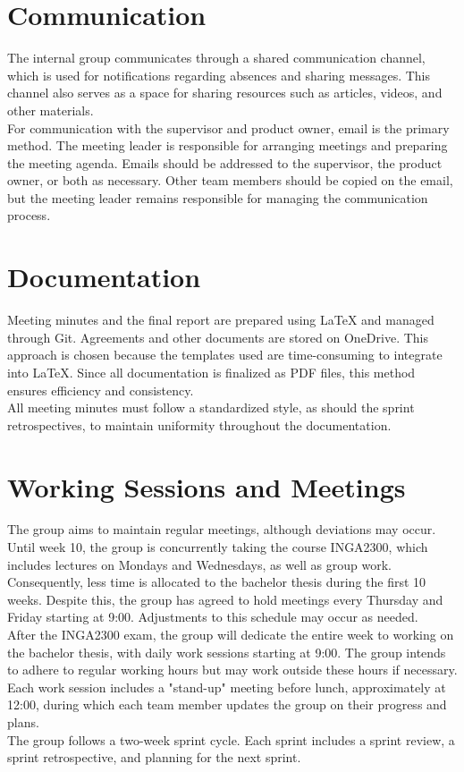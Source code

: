 \section{Communication}
The internal group communicates through a shared communication channel, which is used for notifications regarding absences and sharing messages. This channel also serves as a space for sharing resources such as articles, videos, and other materials.\\

For communication with the supervisor and product owner, email is the primary method. The meeting leader is responsible for arranging meetings and preparing the meeting agenda. Emails should be addressed to the supervisor, the product owner, or both as necessary. Other team members should be copied on the email, but the meeting leader remains responsible for managing the communication process.

\section{Documentation}
Meeting minutes and the final report are prepared using \LaTeX{} and managed through Git. Agreements and other documents are stored on OneDrive. This approach is chosen because the templates used are time-consuming to integrate into \LaTeX{}. Since all documentation is finalized as PDF files, this method ensures efficiency and consistency.\\

All meeting minutes must follow a standardized style, as should the sprint retrospectives, to maintain uniformity throughout the documentation.

\section{Working Sessions and Meetings}

The group aims to maintain regular meetings, although deviations may occur. Until week 10, the group is concurrently taking the course INGA2300, which includes lectures on Mondays and Wednesdays, as well as group work. Consequently, less time is allocated to the bachelor thesis during the first 10 weeks. Despite this, the group has agreed to hold meetings every Thursday and Friday starting at 9:00. Adjustments to this schedule may occur as needed.\\

After the INGA2300 exam, the group will dedicate the entire week to working on the bachelor thesis, with daily work sessions starting at 9:00. The group intends to adhere to regular working hours but may work outside these hours if necessary. Each work session includes a "stand-up" meeting before lunch, approximately at 12:00, during which each team member updates the group on their progress and plans.\\

The group follows a two-week sprint cycle. Each sprint includes a sprint review, a sprint retrospective, and planning for the next sprint.